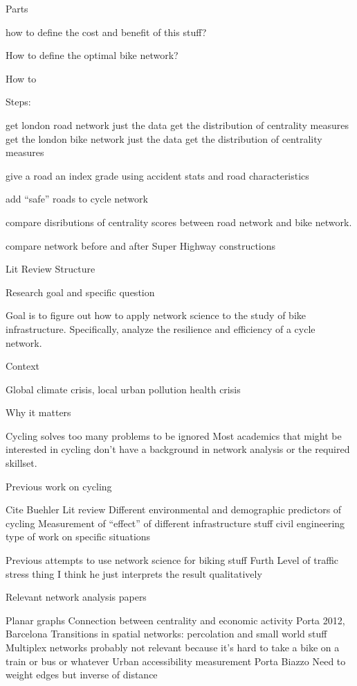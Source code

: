 \documentclass[11pt]{article} %
\begin{document}
	Parts
	
how to define the cost and benefit of this stuff?

How to define the optimal bike network?

How to 




Steps:

	get london road network
		just the data
		get the distribution of centrality measures
	get the london bike network
		just the data
		get the distribution of centrality measures
		
	give a road an index grade
		using accident stats and road characteristics
		
	add ``safe'' roads to cycle network
	
	compare disributions of centrality scores between road network and bike network. 
	
	compare network before and after Super Highway constructions
	
	
	
	
	
Lit Review Structure

	Research goal  and specific question
	
		Goal is to figure out how to apply network science to the study of bike infrastructure. Specifically, analyze the resilience and efficiency of a cycle network. 
	
	Context
	
		Global climate crisis, 
		local urban pollution
		health crisis

	Why it matters
		
		Cycling solves too many problems to be ignored
		Most academics that might be interested in cycling don't have a background in network analysis or the required skillset. 
	
	Previous work on cycling
	
		Cite Buehler Lit review
		Different environmental and demographic predictors of cycling
		Measurement of ``effect'' of different infrastructure stuff
		civil engineering type of work on specific situations
	
	Previous attempts to use network science for biking stuff
		Furth Level of traffic stress thing
			I think he just interprets the result qualitatively
	
	Relevant network analysis papers
		
		Planar graphs
		Connection between centrality and economic activity
			Porta 2012, Barcelona
		Transitions in spatial networks: percolation and small world stuff
		Multiplex networks probably not relevant because it's hard to take a bike on a train or bus or whatever
		Urban accessibility measurement
			Porta 
			Biazzo
			Need to weight edges but inverse of distance
	
\end{document}
